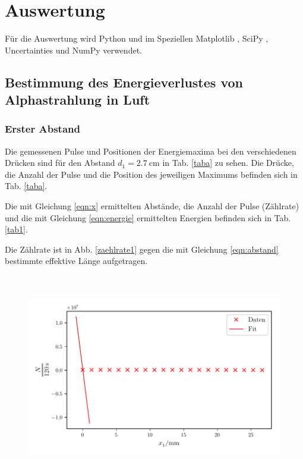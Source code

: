 \section{Auswertung}
\label{sec:Auswertung}

Für die Auswertung wird Python und im Speziellen Matplotlib \cite{matplotlib}, SciPy \cite{scipy}, Uncertainties \cite{uncertainties} und NumPy \cite{numpy} verwendet.

\subsection{Bestimmung des Energieverlustes von Alphastrahlung in Luft}

\subsubsection{Erster Abstand}
Die gemessenen Pulse und Positionen der Energiemaxima bei den verschiedenen Drücken sind für den Abstand $d_1 = \SI{2.7}{\centi\meter}$ in Tab. \ref{taba} zu sehen. Die Drücke, die Anzahl der Pulse und die Position des jeweiligen Maximums befinden sich in Tab. \ref{taba}. 



Die mit Gleichung \eqref{eqn:x} ermittelten Abstände, die Anzahl der Pulse (Zählrate) und die mit Gleichung \eqref{eqn:energie} ermittelten Energien befinden sich in Tab. \ref{tab1}. 

\noindent Die Zählrate ist in Abb. \ref{zaehlrate1} gegen die mit Gleichung \eqref{eqn:abstand} bestimmte effektive Länge aufgetragen.
\begin{figure}
    \centering
    \includegraphics[width=12cm, height=9cm]{build/plota.pdf}
    \caption{}
    \label{fig:zaehlrate1}
\end{figure}


